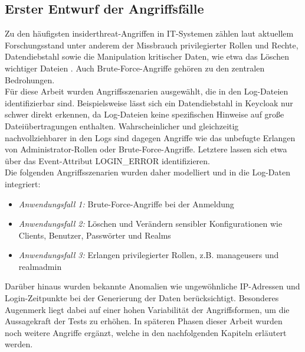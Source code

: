 \documentclass[a4paper,12pt]{article}
\begin{document}
	\subsection{Erster Entwurf der Angriffsfälle}
	Zu den häufigsten \gls{insiderthreat}-Angriffen in IT-Systemen zählen laut aktuellem Forschungsstand unter anderem der Missbrauch privilegierter Rollen und Rechte, Datendiebstahl sowie die Manipulation kritischer Daten, wie etwa das Löschen wichtiger Dateien \cite[S.6]{singh2022insiderthreats}. Auch Brute-Force-Angriffe gehören zu den zentralen Bedrohungen.
	\\[0.5em]
	Für diese Arbeit wurden Angriffsszenarien ausgewählt, die in den Log-Dateien identifizierbar sind. Beispielsweise lässt sich ein Datendiebstahl in Keycloak nur schwer direkt erkennen, da Log-Dateien keine spezifischen Hinweise auf große Dateiübertragungen enthalten. Wahrscheinlicher und gleichzeitig nachvollziehbarer in den Logs sind dagegen Angriffe wie das unbefugte Erlangen von Administrator-Rollen oder Brute-Force-Angriffe. Letztere lassen sich etwa über das Event-Attribut LOGIN\_ERROR identifizieren.
	\\[0.5em]
	Die folgenden Angriffsszenarien wurden daher modelliert und in die Log-Daten integriert:
	
	\begin{itemize}
		\item \textit{Anwendungsfall 1:} Brute-Force-Angriffe bei der Anmeldung
		\item \textit{Anwendungsfall 2:} Löschen und Verändern sensibler Konfigurationen wie Clients, Benutzer, Passwörter und Realms
		\item \textit{Anwendungsfall 3:} Erlangen privilegierter Rollen, z.B. \gls{manageusers} und \gls{realmadmin}
	\end{itemize}
	Darüber hinaus wurden bekannte Anomalien wie ungewöhnliche IP-Adressen und Login-Zeitpunkte bei der Generierung der Daten berücksichtigt. Besonderes Augenmerk liegt dabei auf einer hohen Variabilität der Angriffsformen, um die Aussagekraft der Tests zu erhöhen. In späteren Phasen dieser Arbeit wurden noch weitere Angriffe ergänzt, welche in den nachfolgenden Kapiteln erläutert werden.
\end{document}
